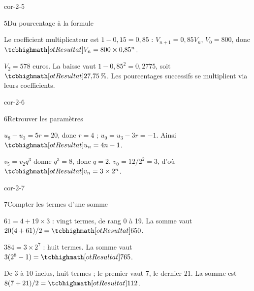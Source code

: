 \begin{blocLivre}{cor-2-5}
\begin{corrige}{5}{Du pourcentage à la formule}
\begin{questions}\item Le coefficient multiplicateur est $1-0{,}15=0{,}85$ :
$V_{n+1}=0{,}85V_n$, $V_0=800$, donc $\res{V_n=800\times0{,}85^n}$.
\item $V_2=578$ euros. La baisse vaut $1-0{,}85^2=0{,}2775$, soit
$\res{27{,}75\,\%}$. Les pourcentages successifs se multiplient via leurs coefficients.
\end{questions}
\end{corrige}
\end{blocLivre}
\begin{blocLivre}{cor-2-6}
\begin{corrige}{6}{Retrouver les paramètres}
\begin{questions}
\item {}
$u_8-u_3=5r=20$, donc $r=4$ ; $u_0=u_3-3r=-1$.
Ainsi $\res{u_n=4n-1}$.
\item $v_5=v_2q^3$ donne $q^3=8$, donc $q=2$.
$v_0=12/2^2=3$, d'où $\res{v_n=3\times2^n}$.
\end{questions}
\end{corrige}
\end{blocLivre}
\begin{blocLivre}{cor-2-7}
\begin{corrige}{7}{Compter les termes d'une somme}
\begin{questions}
\item $61=4+19\times3$ : vingt termes, de rang 0 à 19.
La somme vaut $20(4+61)/2=\res{650}$.
\item $384=3\times2^7$ : huit termes. La somme vaut
$3(2^8-1)=\res{765}$.
\item De 3 à 10 inclus, huit termes ; le premier vaut 7, le dernier 21.
La somme est $8(7+21)/2=\res{112}$.
\end{questions}
\end{corrige}
\end{blocLivre}

